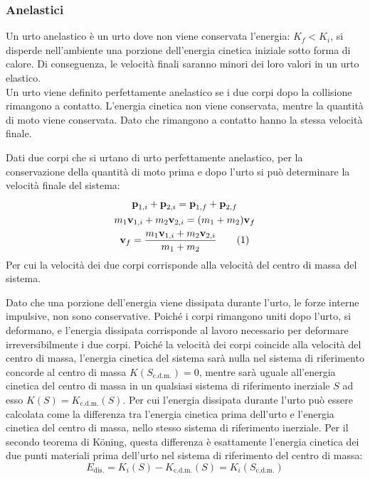 \documentclass{article}
\newcommand{\vect}[1]{\boldsymbol{\mathbf{#1}}}
\numberwithin{equation}{subsection}
\begin{document}
\subsubsection{Anelastici}


Un urto anelastico è un urto dove non viene conservata 
l'energia: $K_f<K_i$, si disperde nell'ambiente una porzione 
dell'energia cinetica iniziale sotto forma di calore. Di conseguenza, le velocità 
finali saranno minori dei loro valori in un urto elastico. 
\\
Un urto viene definito perfettamente anelastico se i due corpi dopo la collisione rimangono a contatto. L'energia cinetica non viene conservata, 
mentre la quantità di moto viene conservata. Dato che rimangono a contatto hanno la stessa velocità finale. 


Dati due corpi che si urtano di urto perfettamente anelastico, per la conservazione della quantità di moto prima e dopo l'urto si può determinare la velocità finale del sistema: 
\begin{gather*}
    \vect{p}_{1,i}+\vect{p}_{2,i}=\vect{p}_{1,f}+\vect{p}_{2,f}\\
    m_1\vect{v}_{1,i}+m_2\vect{v}_{2,i}=(m_1+m_2)\vect{v}_f\\
    \vect{v}_f=\displaystyle\frac{m_1\vect{v}_{1,i}+m_2\vect{v}_{2,i}}{m_1+m_2}\tag{\stepcounter{equation}\theequation}
\end{gather*}
Per cui la velocità dei due corpi corrisponde 
alla velocità del centro di massa del sistema. 



Dato che una porzione dell'energia viene dissipata durante l'urto, le forze interne impulsive, non sono conservative. Poiché i corpi rimangono 
uniti dopo l'urto, si deformano, e l'energia dissipata corrisponde al lavoro necessario per deformare irreversibilmente i due corpi. 
Poiché la velocità dei corpi coincide alla velocità del centro di massa, 
l'energia cinetica del sistema sarà nulla nel sistema di 
riferimento concorde al centro di massa $K(S_{\mathrm{c.d.m.}})=0$, mentre sarà uguale all'energia 
cinetica del centro di massa in un qualsiasi sistema di riferimento inerziale $S$ 
ad esso $K(S)=K_{\mathrm{c.d.m.}}(S)$. Per cui l'energia dissipata durante l'urto può essere calcolata come la differenza tra l'energia cinetica prima dell'urto e 
l'energia cinetica del centro di massa, nello stesso sistema di riferimento inerziale. Per il secondo teorema di K\"oning, questa differenza è esattamente l'energia cinetica dei due punti materiali prima dell'urto 
nel sistema di riferimento del centro di massa: 
\begin{equation}
    E_\mathrm{dis.}=K_i(S)-K_{\mathrm{c.d.m.}}(S)=K_i(S_{\mathrm{c.d.m.}})
\end{equation}
\end{document}
